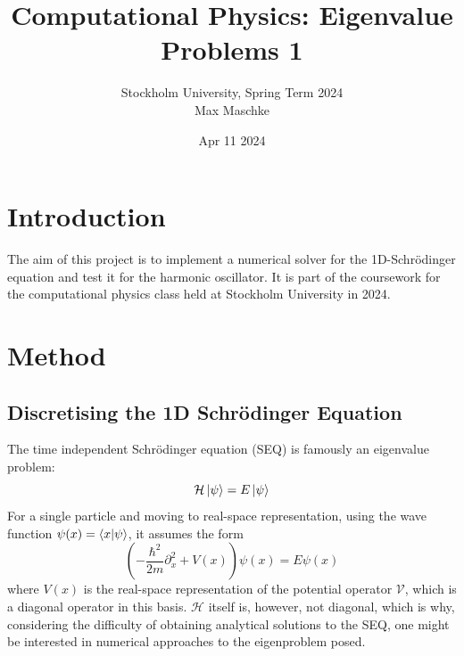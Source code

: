 \documentclass[a4paper,DIV=12,english]{scrartcl}
\title{Computational Physics: Eigenvalue Problems 1}
\author{Stockholm University, Spring Term 2024 \\Max Maschke}
\date{Apr 11 2024}
\begin{document}
\maketitle


\tableofcontents
\newpage


\newpage
\section{Introduction}
The aim of this project is to implement a numerical solver for the 1D-Schrödinger equation and test it for the harmonic oscillator. It is part of the coursework for the computational physics class held at Stockholm University in 2024.

\section{Method}
\subsection{Discretising the 1D Schrödinger Equation}
The time independent Schrödinger equation (SEQ) is famously an eigenvalue problem: 
\begin{equation}\label{SEQ}
    \mathcal{H}\ket{\psi} = E\ket{\psi}
\end{equation}
For a single particle and moving to real-space representation, using the wave function $\psi(x) = \braket{x|\psi}$, it assumes the form 
\begin{equation}
    \left(-\frac{\hbar^2}{2m}\partial_x^2 + V(x)\right)\psi(x) = E\psi(x)
\end{equation}
where $V(x)$ is the real-space representation of the potential operator $\mathcal{V}$, which is a diagonal operator in this basis. $\mathcal{H}$ itself is, however, not diagonal, which is why, considering the difficulty of obtaining analytical solutions to the SEQ, one might be interested in numerical approaches to the eigenproblem posed.
\end{document}
